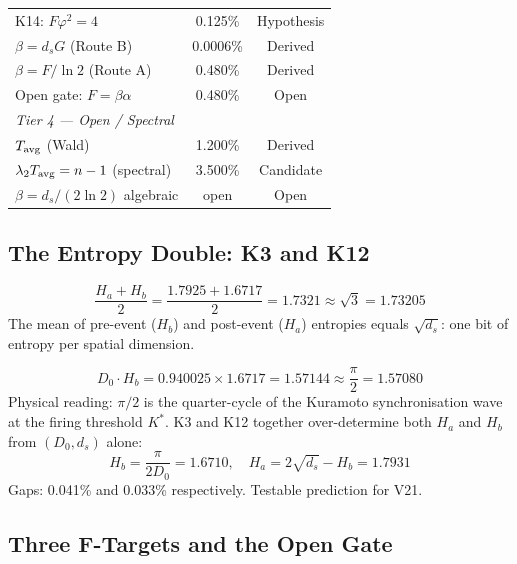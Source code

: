 \documentclass[12pt, a4paper]{article}
\begin{document}
{\begin{longtable}{p{8cm}cc}
K14: $F\varphi^2=4$ & 0.125\% & Hypothesis\\
$\beta=d_s G$ (Route B) & 0.0006\% & Derived\\
$\beta=F/\ln 2$ (Route A) & 0.480\% & Derived\\
Open gate: $F=\beta\alpha$ & 0.480\% & Open\\[4pt]
\multicolumn{3}{l}{\textit{Tier 4 --- Open / Spectral}}\\
$T_{\rm avg}$ (Wald) & 1.200\% & Derived\\
$\lambda_2 T_{\rm avg}=n-1$ (spectral) & 3.500\% & Candidate\\
$\beta=d_s/(2\ln 2)$ algebraic & open & Open\\
\end{longtable}
\vspace{-\parskip}
}

\subsection{The Entropy Double: K3 and K12}

\begin{derivedbox}[title={K3: $(H_a+H_b)/2=\sqrt{d_s}$ (gap 0.003\%)}]
\[
  \frac{H_a+H_b}{2} = \frac{1.7925+1.6717}{2} = 1.7321\approx\sqrt{3}=1.73205
\]
The mean of pre-event ($H_b$) and post-event ($H_a$) entropies equals $\sqrt{d_s}$: one bit of entropy per spatial dimension.
\end{derivedbox}

\begin{keybox}[title={K12: $D_0 H_b=\pi/2$ (gap 0.041\%, Hypothesis)}]
\[
  D_0\cdot H_b = 0.940025\times 1.6717 = 1.57144\approx\frac{\pi}{2}=1.57080
\]
Physical reading: $\pi/2$ is the quarter-cycle of the Kuramoto synchronisation wave at the firing threshold $K^*$. K3 and K12 together over-determine both $H_a$ and $H_b$ from $(D_0,d_s)$ alone:
\[
  H_b = \frac{\pi}{2D_0} = 1.6710,\quad H_a = 2\sqrt{d_s}-H_b = 1.7931
\]
Gaps: 0.041\% and 0.033\% respectively. Testable prediction for V21.
\end{keybox}

\subsection{Three F-Targets and the Open Gate}
\end{document}

